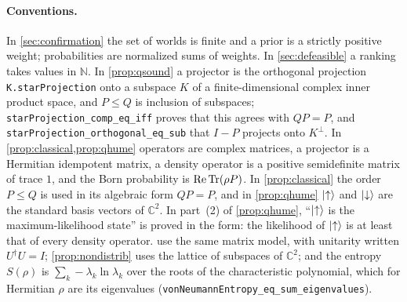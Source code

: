 \paragraph{Conventions.} In \cref{sec:confirmation} the set of worlds is finite and a prior is a
strictly positive weight; probabilities are normalized sums of weights. In
\cref{sec:defeasible} a ranking takes values in $\mathbb N$.
In \cref{prop:qsound} a projector is the
orthogonal projection \texttt{K.starProjection} onto a subspace $K$ of a finite-dimensional complex
inner product space, and $P\le Q$ is inclusion of subspaces; \texttt{starProjection\_comp\_eq\_iff}
proves that this agrees with $QP=P$, and \texttt{starProjection\_orthogonal\_eq\_sub} that
$I-P$ projects onto $K^\perp$. In \cref{prop:classical,prop:qhume} operators are complex matrices,
a projector is a Hermitian idempotent matrix, a density operator is a positive semidefinite matrix of
trace $1$, and the Born probability is $\operatorname{Re}\operatorname{Tr}(\rho P)$. In \cref{prop:classical}
the order $P\le Q$ is used in its algebraic form $QP=P$, and in \cref{prop:qhume} $\lvert {\uparrow}\rangle$ and
$\lvert {\downarrow}\rangle$ are the standard basis vectors of $\mathbb C^2$. In part~(2) of \cref{prop:qhume},
``$\lvert {\uparrow}\rangle$ is the maximum-likelihood state'' is proved in the form: the likelihood of $\lvert {\uparrow}\rangle$
is at least that of every density operator.  use the same matrix model, with
unitarity written $U^\dagger U=I$; \cref{prop:nondistrib} uses the lattice of subspaces of
$\mathbb C^2$; and the entropy $S(\rho)$ is $\sum_k-\lambda_k\ln\lambda_k$ over the roots of the
characteristic polynomial, which for Hermitian $\rho$ are its eigenvalues
(\texttt{vonNeumannEntropy\_eq\_sum\_eigenvalues}).

